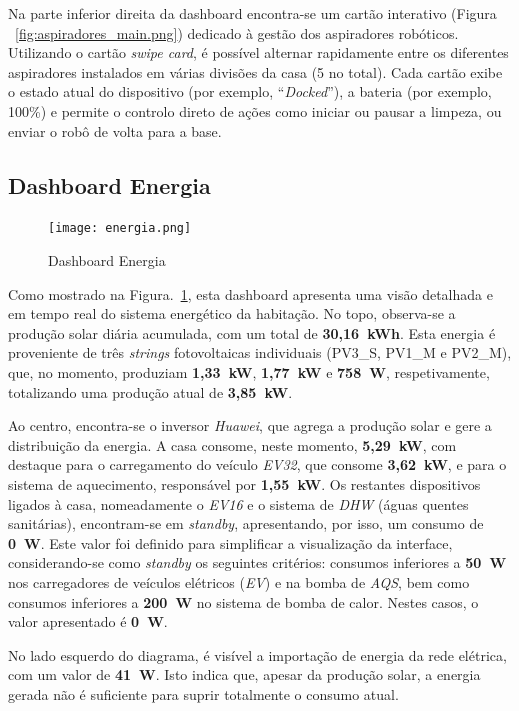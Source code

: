 Na parte inferior direita da dashboard encontra-se um cartão interativo (Figura ~\ref{fig:aspiradores_main.png}) dedicado à gestão dos aspiradores robóticos. Utilizando o cartão \textit{swipe card}, é possível alternar rapidamente entre os diferentes aspiradores instalados em várias divisões da casa (5 no total). Cada cartão exibe o estado atual do dispositivo (por exemplo, “\textit{Docked}”), a bateria (por exemplo, 100\%) e permite o controlo direto de ações como iniciar ou pausar a limpeza, ou enviar o robô de volta para a base.

\newpage

\subsection{Dashboard Energia}

\begin{figure}[H]
    \centering
    \texttt{[image: energia.png]}
    \caption{Dashboard Energia}
    \label{fig:energia.png}
\end{figure}

Como mostrado na Figura.~\ref{fig:energia.png}, esta dashboard apresenta uma visão detalhada e em tempo real do sistema energético da habitação. No topo, observa-se a produção solar diária acumulada, com um total de \textbf{30,16~kWh}. Esta energia é proveniente de três \textit{strings} fotovoltaicas individuais (PV3\_S, PV1\_M e PV2\_M), que, no momento, produziam \textbf{1,33~kW}, \textbf{1,77~kW} e \textbf{758~W}, respetivamente, totalizando uma produção atual de \textbf{3,85~kW}.

Ao centro, encontra-se o inversor \textit{Huawei}, que agrega a produção solar e gere a distribuição da energia. A casa consome, neste momento, \textbf{5,29~kW}, com destaque para o carregamento do veículo \textit{EV32}, que consome \textbf{3,62~kW}, e para o sistema de aquecimento, responsável por \textbf{1,55~kW}. Os restantes dispositivos ligados à casa, nomeadamente o \textit{EV16} e o sistema de \textit{DHW} (águas quentes sanitárias), encontram-se em \textit{standby}, apresentando, por isso, um consumo de \textbf{0~W}. Este valor foi definido para simplificar a visualização da interface, considerando-se como \textit{standby} os seguintes critérios: consumos inferiores a \textbf{50~W} nos carregadores de veículos elétricos (\textit{EV}) e na bomba de \textit{AQS}, bem como consumos inferiores a \textbf{200~W} no sistema de bomba de calor. Nestes casos, o valor apresentado é \textbf{0~W}.

No lado esquerdo do diagrama, é visível a importação de energia da rede elétrica, com um valor de \textbf{41~W}. Isto indica que, apesar da produção solar, a energia gerada não é suficiente para suprir totalmente o consumo atual.

